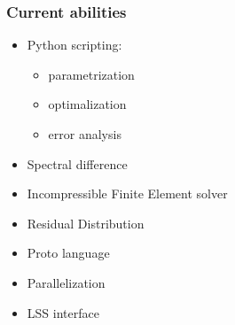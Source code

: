 \documentclass{beamer}
\begin{document}
\begin{frame}
 \frametitle{Current abilities}
\begin{itemize}
 \item Python scripting: 
  \begin{itemize}
   \item parametrization
   \item optimalization
   \item error analysis
  \end{itemize}
 \item Spectral difference
 \item Incompressible Finite Element solver
 \item Residual Distribution
 \item Proto language
 \item Parallelization
 \item LSS interface
\end{itemize}

\end{frame}
\end{document}
